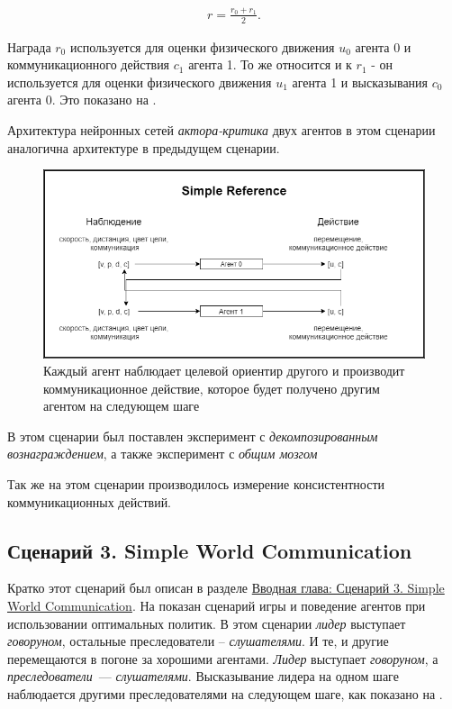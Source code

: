 \begin{equation}
    \begin{multlined}
        r = \frac{r_0 + r_1}{2}.
    \end{multlined}
\end{equation}

Награда $r_0$ используется для оценки физического движения $u_0$ агента 0 и коммуникационного действия $c_1$ агента 1. То же относится и к $r_1$ - он используется для оценки физического движения $u_1$ агента 1 и высказывания $c_0$ агента 0. Это показано на .

Архитектура нейронных сетей \textit{актора-критика} двух агентов в этом сценарии аналогична архитектуре в предыдущем сценарии.

\begin{figure}[ht!]
    \center
    \includegraphics [scale=0.60] {my_folder/images/ch4/simple_reference.png}
    \caption{Каждый агент наблюдает целевой ориентир другого и производит коммуникационное действие, которое будет получено другим агентом на следующем шаге}
    \label{fig:exp-sr}
\end{figure}

В этом сценарии был поставлен эксперимент с \textit{декомпозированным вознаграждением}, а также эксперимент с \textit{общим мозгом}

Так же на этом сценарии производилось измерение консистентности коммуникационных действий.

\subsection{Сценарий 3. Simple World Communication} \label{exp-swc}

Кратко этот сценарий был описан в разделе \hyperref[intro-swc]{Вводная глава: Сценарий 3. Simple World Communication}. На  показан сценарий игры и поведение агентов при использовании оптимальных политик. В этом сценарии \textit{лидер} выступает \textit{говоруном}, остальные преследователи – \textit{слушателями}. И те, и другие перемещаются в погоне за хорошими агентами. \textit{Лидер} выступает \textit{говоруном}, а \textit{преследователи}~--- \textit{слушателями}. Высказывание лидера на одном шаге наблюдается другими преследователями на следующем шаге, как показано на .

